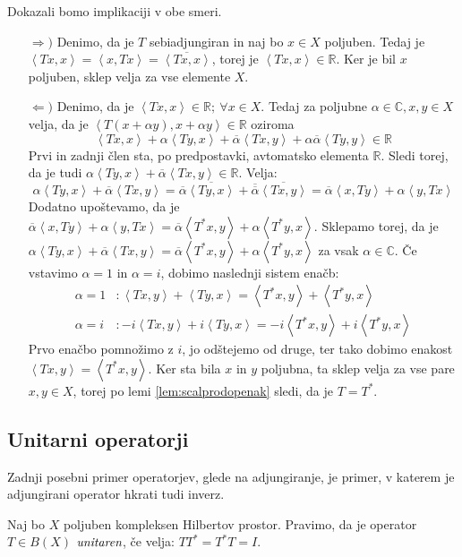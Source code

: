 \documentclass[mat2]{matdelo}
\newcommand{\R}{\mathbb{R}}
\newcommand{\C}{\mathbb{C}}
\newcommand{\pojem}[1]{\ensuremath{\emph{#1}}}
\newcommand{\Sp}[2]{\ensuremath{\left<#1, #2\right>}}
\begin{document}
			\begin{dokaz}
				Dokazali bomo implikaciji v obe smeri.
				\begin{itemize}
					\item[$\Rightarrow)$] Denimo, da je $T$ sebiadjungiran in naj bo $x\in X$ poljuben. Tedaj je $\Sp{Tx}{x} = \Sp{x}{Tx} = \overline{\Sp{Tx}{x}}$, torej je $\Sp{Tx}{x}\in \R$. Ker je bil $x$ poljuben, sklep velja za vse elemente $X$.
					\item[$\Leftarrow)$] Denimo, da je $\Sp{Tx}{x}\in\R;~\forall x\in X$. Tedaj za poljubne $\alpha\in\C, x, y\in X$ velja, da je $\Sp{T(x + \alpha y)}{x + \alpha y}\in \R$ oziroma $$\Sp{Tx}{x} + \alpha\Sp{Ty}{x} + \overline{\alpha}\Sp{Tx}{y} + \alpha\overline{\alpha}\Sp{Ty}{y}\in\R$$
					Prvi in zadnji člen sta, po predpostavki, avtomatsko elementa $\R$. Sledi torej, da je tudi $\alpha\Sp{Ty}{x} + \overline{\alpha}\Sp{Tx}{y}\in\R$. Velja: $$\alpha\Sp{Ty}{x} + \overline{\alpha}\Sp{Tx}{y} = \overline{\alpha}\overline{\Sp{Ty}{x}} + \overline{\overline{\alpha}}\overline{\Sp{Tx}{y}} = \overline{\alpha}\Sp{x}{Ty} + \alpha\Sp{y}{Tx}$$
					Dodatno upoštevamo, da je $\overline{\alpha}\Sp{x}{Ty} + \alpha\Sp{y}{Tx} = \overline{\alpha}\Sp{T^*x}{y} + \alpha\Sp{T^*y}{x}$. Sklepamo torej, da je $\alpha\Sp{Ty}{x} + \overline{\alpha}\Sp{Tx}{y}=\overline{\alpha}\Sp{T^*x}{y} + \alpha\Sp{T^*y}{x}$ za vsak $\alpha\in\C$. Če vstavimo $\alpha = 1$ in $\alpha = i$, dobimo naslednji sistem enačb: \begin{align*}
						\alpha = 1&:\Sp{Tx}{y} + \Sp{Ty}{x} = \Sp{T^*x}{y} + \Sp{T^*y}{x} \\
						\alpha = i&:-i\Sp{Tx}{y} + i\Sp{Ty}{x} = -i\Sp{T^*x}{y} + i\Sp{T^*y}{x}
					\end{align*}
					Prvo enačbo pomnožimo z $i$, jo odštejemo od druge, ter tako dobimo enakost $\Sp{Tx}{y} = \Sp{T^*x}{y}$. Ker sta bila $x$ in $y$ poljubna, ta sklep velja za vse pare $x, y \in X$, torej po lemi \ref{lem:scalprodopenak} sledi, da je $T = T^*$.
				\end{itemize}	
			\end{dokaz}
			
			\subsection{Unitarni operatorji}
			
			Zadnji posebni primer operatorjev, glede na adjungiranje, je primer, v katerem je adjungirani operator hkrati tudi inverz.
			
			\begin{definicija}
				\label{def:unitarop}
				Naj bo $X$ poljuben kompleksen Hilbertov prostor. Pravimo, da je operator $T\in B(X)$ \pojem{unitaren}, če velja: $TT^* = T^*T = I$.
			\end{definicija}
			
\end{document}
